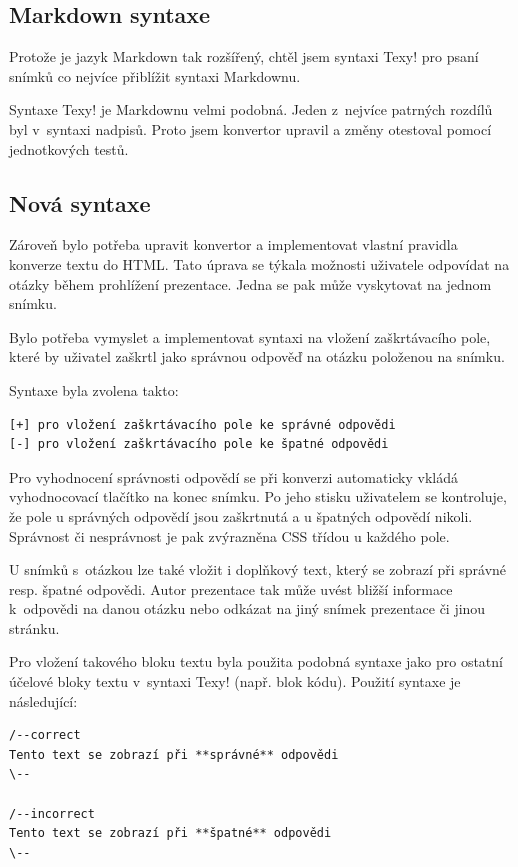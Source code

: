 \documentclass[11pt,twoside,a4paper]{book}
\begin{document}
\subsection{Markdown syntaxe}
Protože je jazyk Markdown tak rozšířený, chtěl jsem syntaxi Texy! pro psaní snímků co nejvíce přiblížit syntaxi
Markdownu.

Syntaxe Texy! je Markdownu velmi podobná. Jeden z~nejvíce patrných rozdílů byl v~syntaxi nadpisů. Proto jsem konvertor
upravil a změny otestoval pomocí jednotkových testů.

\subsection{Nová syntaxe}
Zároveň bylo potřeba upravit konvertor a implementovat vlastní pravidla konverze textu do HTML. Tato úprava se týkala
možnosti uživatele odpovídat na otázky během prohlížení prezentace. Jedna se pak může vyskytovat na jednom snímku.

Bylo potřeba vymyslet a implementovat syntaxi na vložení zaškrtávacího pole, které by uživatel zaškrtl jako správnou
odpověď na otázku položenou na snímku.

Syntaxe byla zvolena takto:

\begin{lstlisting}
[+] pro vložení zaškrtávacího pole ke správné odpovědi
[-] pro vložení zaškrtávacího pole ke špatné odpovědi
\end{lstlisting}

Pro vyhodnocení správnosti odpovědí se při konverzi automaticky vkládá vyhodnocovací tlačítko na konec snímku. Po jeho
stisku uživatelem se kontroluje, že pole u správných odpovědí jsou zaškrtnutá a u špatných odpovědí nikoli. Správnost
či nesprávnost je pak zvýrazněna CSS třídou u každého pole.

U snímků s~otázkou lze také vložit i doplňkový text, který se zobrazí při správné resp. špatné odpovědi. Autor
prezentace tak může uvést bližší informace k~odpovědi na danou otázku nebo odkázat na jiný snímek prezentace či jinou
stránku.

Pro vložení takového bloku textu byla použita podobná syntaxe jako pro ostatní účelové bloky textu v~syntaxi Texy!
(např. blok kódu). Použití syntaxe je následující:

\begin{lstlisting}
/--correct
Tento text se zobrazí při **správné** odpovědi
\--

/--incorrect
Tento text se zobrazí při **špatné** odpovědi
\--
\end{lstlisting}
\end{document}
